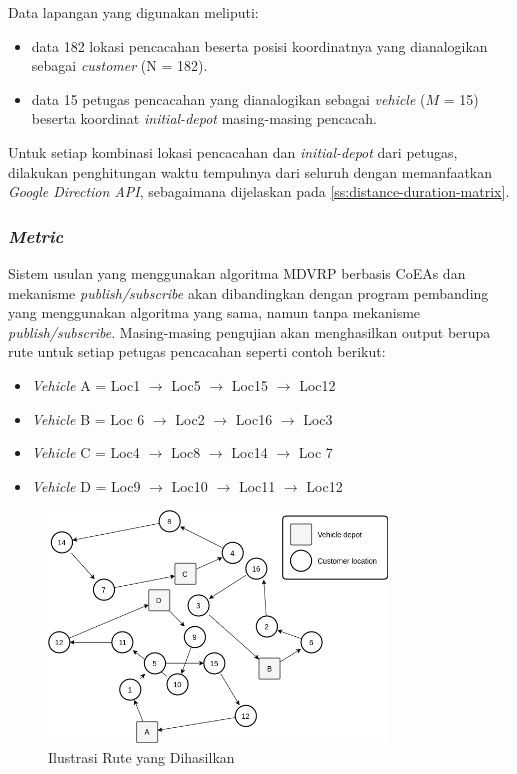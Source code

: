 Data lapangan yang digunakan meliputi:
\begin{itemize}
	\item data 182 lokasi pencacahan beserta posisi koordinatnya yang dianalogikan sebagai \textit{customer} (N = 182). 
	\item data 15 petugas pencacahan yang dianalogikan sebagai \textit{vehicle} ($M$ = 15) beserta koordinat \textit{initial-depot} masing-masing pencacah.
\end{itemize}

Untuk setiap kombinasi lokasi pencacahan dan \textit{initial-depot} dari petugas, dilakukan penghitungan waktu tempuhnya  dari seluruh dengan memanfaatkan \textit{Google Direction API}, sebagaimana dijelaskan pada \autoref{ss:distance-duration-matrix}.


\subsubsection{\textit{Metric}}
\label{sssec:metric}
Sistem usulan yang menggunakan algoritma MDVRP berbasis CoEAs dan mekanisme \textit{publish/subscribe} akan dibandingkan dengan program pembanding yang menggunakan algoritma yang sama, namun tanpa mekanisme \textit{publish/subscribe}. Masing-masing pengujian akan menghasilkan output berupa rute untuk setiap petugas pencacahan seperti contoh berikut:

\begin{itemize}
\item \textit{Vehicle} A = Loc1 $\rightarrow$ Loc5 $\rightarrow$ Loc15 $\rightarrow$ Loc12
\item \textit{Vehicle} B = Loc 6 $\rightarrow$ Loc2 $\rightarrow$ Loc16 $\rightarrow$ Loc3
\item \textit{Vehicle} C = Loc4 $\rightarrow$ Loc8 $\rightarrow$ Loc14 $\rightarrow$ Loc 7
\item \textit{Vehicle} D = Loc9 $\rightarrow$ Loc10 $\rightarrow$ Loc11 $\rightarrow$ Loc12
\end{itemize}


\begin{figure}[!]
	\centering
	\includegraphics[width=9cm]{Resources/Images/result-mdvrp-illustration}
	\caption{Ilustrasi Rute yang Dihasilkan}
	\label{fig:result-mdvrp-illustration}
\end{figure}


